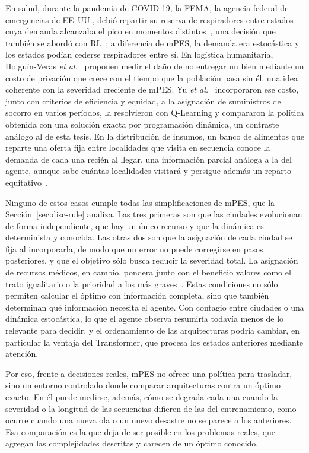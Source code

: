 \documentclass[../00_Main/Main.tex]{subfiles}
\begin{document}
En salud, durante la pandemia de COVID-19, la FEMA, la agencia federal de
emergencias de EE.\,UU., debi\'o repartir su reserva de respiradores entre
estados cuya demanda alcanzaba el pico en momentos
distintos~\citep{Mehrotra2020}, una decisi\'on que tambi\'en se abord\'o
con RL~\citep{Bednarski2021}; a diferencia de mPES, la demanda era
estoc\'astica y los estados pod\'ian cederse respiradores entre s\'i. En
log\'istica humanitaria, Holgu\'in-Veras \emph{et
al.}~\citep{HolguinVeras2013} proponen medir el da\~no de no entregar un
bien mediante un costo de privaci\'on que crece con el tiempo que la
poblaci\'on pasa sin \'el, una idea coherente con la severidad creciente
de mPES. Yu \emph{et al.}~\citep{YuLina2021} incorporaron ese costo, junto con
criterios de eficiencia y equidad, a la asignaci\'on de suministros de
socorro en varios per\'iodos, la resolvieron con Q-Learning y compararon
la pol\'itica obtenida con una soluci\'on exacta por programaci\'on
din\'amica, un contraste an\'alogo al de esta tesis. En
la distribuci\'on de insumos, un banco de alimentos que reparte una oferta
fija entre localidades que visita en secuencia conoce la demanda de cada
una reci\'en al llegar, una informaci\'on parcial an\'aloga a la del
agente, aunque sabe cu\'antas localidades visitar\'a y persigue adem\'as
un reparto equitativo~\citep{Sinclair2023}.

Ninguno de estos casos cumple todas las simplificaciones de mPES, que la
Secci\'on~\ref{sec:disc-rule} analiza. Las tres primeras son que las
ciudades evolucionan de forma independiente, que hay un \'unico recurso y
que la din\'amica es determinista y conocida. Las otras dos son que la
asignaci\'on de cada ciudad se fija al incorporarla, de modo que un error
no puede corregirse en pasos posteriores, y que el objetivo s\'olo busca
reducir la severidad total. La asignaci\'on de recursos m\'edicos, en
cambio, pondera junto con el beneficio valores como el trato igualitario o
la prioridad a los m\'as graves~\citep{Emanuel2020}. Estas condiciones no
s\'olo permiten calcular el \'optimo con informaci\'on completa, sino que
tambi\'en determinan qu\'e informaci\'on necesita el agente. Con contagio
entre ciudades o una din\'amica estoc\'astica, lo que el agente observa
resumir\'ia todav\'ia menos de lo relevante para decidir, y el
ordenamiento de las arquitecturas podr\'ia cambiar, en particular la
ventaja del Transformer, que procesa los estados anteriores mediante
atenci\'on.

Por eso, frente a decisiones reales, mPES no ofrece una pol\'itica para
trasladar, sino un entorno controlado donde comparar arquitecturas contra
un \'optimo exacto. En \'el puede medirse, adem\'as, c\'omo se degrada
cada una cuando la severidad o la longitud de las secuencias difieren de
las del entrenamiento, como ocurre cuando una nueva ola o un nuevo
desastre no se parece a los anteriores. Esa comparaci\'on es la que deja
de ser posible en los problemas reales, que agregan las complejidades
descritas y carecen de un \'optimo conocido.
\end{document}
